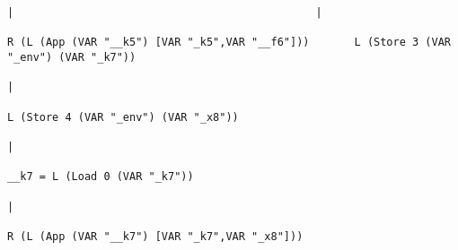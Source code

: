 \begin{landscape}
\begin{lstlisting}[basicstyle=\fontsize{6}{7}\selectfont\ttfamily]
                                                                                                                   |                                               |
                                                                                            R (L (App (VAR "__k5") [VAR "_k5",VAR "__f6"]))       L (Store 3 (VAR "_env") (VAR "_k7"))
                                                                                                                                                                   |
                                                                                                                                                  L (Store 4 (VAR "_env") (VAR "_x8"))
                                                                                                                                                                   |
                                                                                                                                                     __k7 = L (Load 0 (VAR "_k7"))
                                                                                                                                                                   |
                                                                                                                                             R (L (App (VAR "__k7") [VAR "_k7",VAR "_x8"]))

\end{lstlisting}
\end{landscape}
\clearpage

